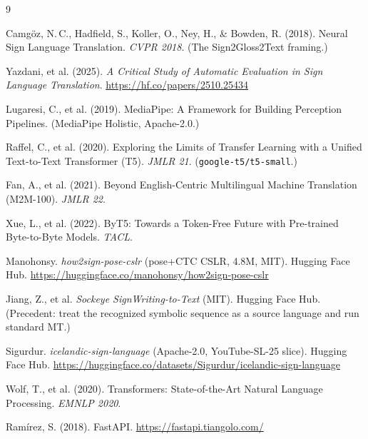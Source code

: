 \documentclass[12pt,a4paper]{article}
\begin{document}
\newpage
\begin{thebibliography}{9}

 Camg\"oz, N.\,C., Hadfield, S., Koller, O., Ney, H., \& Bowden, R. (2018). Neural Sign Language Translation. \textit{CVPR 2018}. (The Sign2Gloss2Text framing.)

 Yazdani, et al. (2025). \textit{A Critical Study of Automatic Evaluation in Sign Language Translation}. \url{https://hf.co/papers/2510.25434}

 Lugaresi, C., et al. (2019). MediaPipe: A Framework for Building Perception Pipelines. (MediaPipe Holistic, Apache-2.0.)

 Raffel, C., et al. (2020). Exploring the Limits of Transfer Learning with a Unified Text-to-Text Transformer (T5). \textit{JMLR 21}. (\texttt{google-t5/t5-small}.)

 Fan, A., et al. (2021). Beyond English-Centric Multilingual Machine Translation (M2M-100). \textit{JMLR 22}.

 Xue, L., et al. (2022). ByT5: Towards a Token-Free Future with Pre-trained Byte-to-Byte Models. \textit{TACL}.

 Manohonsy. \textit{how2sign-pose-cslr} (pose+CTC CSLR, 4.8M, MIT). Hugging Face Hub. \url{https://huggingface.co/manohonsy/how2sign-pose-cslr}

 Jiang, Z., et al. \textit{Sockeye SignWriting-to-Text} (MIT). Hugging Face Hub. (Precedent: treat the recognized symbolic sequence as a source language and run standard MT.)

 Sigurdur. \textit{icelandic-sign-language} (Apache-2.0, YouTube-SL-25 slice). Hugging Face Hub. \url{https://huggingface.co/datasets/Sigurdur/icelandic-sign-language}

 Wolf, T., et al. (2020). Transformers: State-of-the-Art Natural Language Processing. \textit{EMNLP 2020}.

 Ram\'irez, S. (2018). FastAPI. \url{https://fastapi.tiangolo.com/}

\end{thebibliography}
\end{document}
